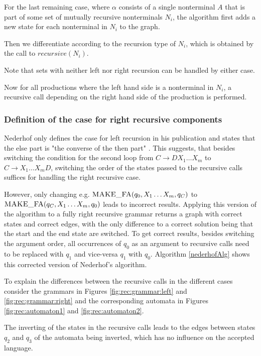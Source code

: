 For the last remaining case, where $\alpha$ consists of a single nonterminal $A$ that is part of some set of mutually recursive nonterminals $N_i$, the algorithm first adds a new state for each nonterminal in $N_i$ to the graph.

Then we differentiate according to the recursion type of $N_i$, which is obtained by the call to $recursive(N_i)$.

Note that sets with neither left nor right recursion can be handled by either case.

Now for all productions where the left hand side is a nonterminal in $N_i$, a recursive call depending on the right hand side of the production is performed. 

\subsubsection{Definition of the case for right recursive components}

Nederhof only defines the case for left recursion in his publication and states that the else part is "the converse of the then part" \cite{nederhof}. This suggests, that besides switching the condition for the second loop from $C \rightarrow DX_1 \ldots X_m$ to  $C \rightarrow X_1 \ldots X_mD$, switching the order of the states passed to the recursive calls suffices for handling the right recursive case.

However, only changing e.g. $\textproc{MAKE\_FA}(q_0, X_1 \ldots X_m, q_C)$ to $\textproc{MAKE\_FA}(q_C, X_1 \ldots X_m, q_0)$ leads to incorrect results. Applying this version of the algorithm to a fully right recursive grammar returns a graph with correct states and correct edges, with the only difference to a correct solution being that the start and the end state are switched. To get correct results, besides switching the argument order, all occurrences of $q_0$ as an argument to recursive calls need to be replaced with $q_1$ and vice-versa $q_1$ with $q_0$. Algorithm \ref{nederhofAlg} shows this corrected version of Nederhof's algorithm.

To explain the differences between the recursive calls in the different cases consider the grammars in Figures \ref{fig:rec:grammar:left} and \ref{fig:rec:grammar:right} and the corresponding automata in Figures \ref{fig:rec:automaton1} and \ref{fig:rec:automaton2}.

The inverting of the states in the recursive calls leads to the edges between states $q_2$ and $q_3$ of the automata being inverted, which has no influence on the accepted language. 

